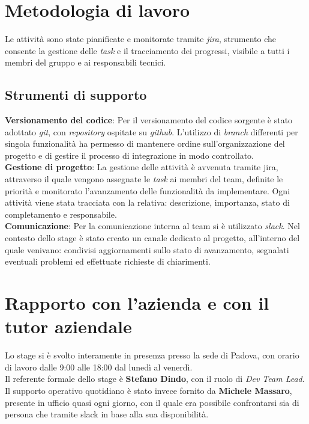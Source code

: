 \section{Metodologia di lavoro}
 
Le attività sono state pianificate e monitorate tramite \emph{\gls{jira}}\glsfirstoccur, 
strumento che consente la gestione delle \emph{task} e il tracciamento dei progressi, 
visibile a tutti i membri del gruppo e ai responsabili tecnici.
 
\subsection{Strumenti di supporto}
 
\textbf{Versionamento del codice}: Per il versionamento del codice sorgente è stato adottato \emph{\gls{git}}\glsfirstoccur, con \emph{repository} ospitate su \emph{\gls{github}}\glsfirstoccur. L'utilizzo di \emph{branch} differenti per singola funzionalità ha permesso di mantenere ordine sull'organizzazione del progetto e di gestire il processo di integrazione in modo controllato.\\
 
\textbf{Gestione di progetto}: La gestione delle attività è avvenuta tramite \gls{jira}, attraverso il quale vengono assegnate le \emph{task} ai membri del team, definite le priorità e monitorato l'avanzamento delle funzionalità da implementare. Ogni attività viene stata tracciata con la relativa: descrizione, importanza, stato di completamento e responsabile.\\

\textbf{Comunicazione}: Per la comunicazione interna al team si è utilizzato \emph{\gls{slack}}\glsfirstoccur. Nel contesto dello stage è stato creato un canale dedicato al progetto, all'interno del quale venivano: condivisi aggiornamenti sullo stato di avanzamento, segnalati eventuali problemi ed effettuate richieste di chiarimenti.

\section{Rapporto con l'azienda e con il tutor aziendale}
Lo stage si è svolto interamente in presenza presso la sede di Padova, con orario 
di lavoro dalle 9:00 alle 18:00 dal lunedì al venerdì. \\

Il referente formale dello stage è \textbf{Stefano Dindo}, con il ruolo di \emph{Dev Team Lead}. Il supporto operativo quotidiano è stato invece fornito da \textbf{Michele Massaro}, presente in ufficio quasi ogni giorno, con il quale era possibile confrontarsi sia di persona che tramite \gls{slack} in base alla sua disponibilità.\\

